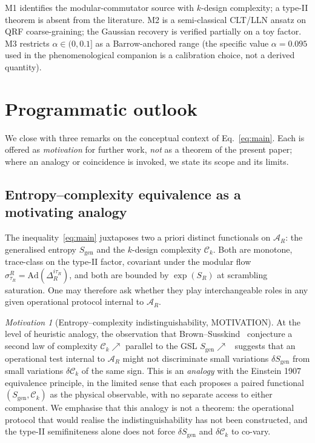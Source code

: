\documentclass[aps,prd,superscriptaddress,nofootinbib,floatfix,10pt]{revtex4-2}
\theoremstyle{remark}
\newtheorem{motivation}{Motivation}
\newcommand{\Sgen}{S_{\mathrm{gen}}}
\newcommand{\tauR}{\tau_{R}}
\newcommand{\Ck}{\mathcal{C}_{k}}
\newcommand{\AR}{\mathcal{A}_{R}}
\begin{document}
M1 identifies the modular-commutator source with $k$-design complexity;
a type-II theorem is absent from the literature. M2 is a
semi-classical CLT/LLN ansatz on QRF coarse-graining; the Gaussian
recovery is verified partially on a toy factor. M3 restricts
$\alpha \in (0, 0.1]$ as a Barrow-anchored range (the specific value
$\alpha = 0.095$ used in the phenomenological companion is a
calibration choice, not a derived quantity).

\section{Programmatic outlook}
\label{sec:outlook}

We close with three remarks on the conceptual context of
Eq.~\eqref{eq:main}. Each is offered as \emph{motivation} for further
work, \emph{not} as a theorem of the present paper; where an analogy or
coincidence is invoked, we state its scope and its limits.

\subsection{Entropy--complexity equivalence as a motivating analogy}
\label{sec:outlook:equivalence}

The inequality~\eqref{eq:main} juxtaposes two a priori distinct
functionals on $\AR$: the generalised entropy $\Sgen$ and the
$k$-design complexity $\Ck$. Both are monotone, trace-class on the
type-II factor, covariant under the modular flow
$\sigma^{R}_{\tauR}=\mathrm{Ad}(\Delta_{R}^{i\tauR})$, and both are
bounded by $\exp(S_R)$ at scrambling saturation. One may therefore ask
whether they play interchangeable roles in any given operational
protocol internal to $\AR$.

\begin{motivation}[Entropy--complexity indistinguishability, MOTIVATION]
\label{motiv:eq}
At the level of heuristic analogy, the observation that
Brown--Susskind~\cite{BrownSusskind2018} conjecture a second law of
complexity $\Ck\nearrow$ parallel to the GSL
$\Sgen\nearrow$~\cite{Wall2011} suggests that an operational test
internal to $\AR$ might not discriminate small variations $\delta\Sgen$
from small variations $\delta\Ck$ of the same sign. This is an
\emph{analogy} with the Einstein 1907 equivalence principle, in the
limited sense that each proposes a paired functional
$(\Sgen,\Ck)$ as the physical observable, with no separate access to
either component. We emphasise that this analogy is not a theorem: the
operational protocol that would realise the indistinguishability has
not been constructed, and the type-II semifiniteness alone does not
force $\delta\Sgen$ and $\delta\Ck$ to co-vary.
\end{motivation}
\end{document}
